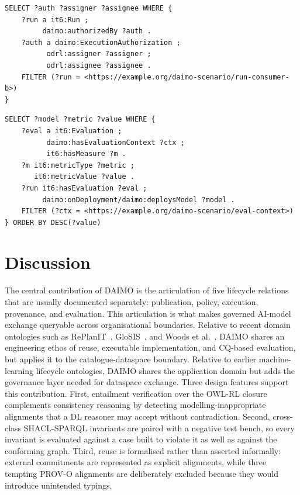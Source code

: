 \documentclass[Afour,sagev,times]{sagej}
\begin{document}
\begin{lstlisting}[label=lst:cq-g3,caption={CQ-G3: authorisation and agreement for a specific run.}]
SELECT ?auth ?assigner ?assignee WHERE {
    ?run a it6:Run ;
         daimo:authorizedBy ?auth .
    ?auth a daimo:ExecutionAuthorization ;
          odrl:assigner ?assigner ;
          odrl:assignee ?assignee .
    FILTER (?run = <https://example.org/daimo-scenario/run-consumer-b>)
}
\end{lstlisting}

\begin{lstlisting}[label=lst:cq-v3,caption={CQ-V3: ranking of models under a shared evaluation context.}]
SELECT ?model ?metric ?value WHERE {
    ?eval a it6:Evaluation ;
          daimo:hasEvaluationContext ?ctx ;
          it6:hasMeasure ?m .
    ?m it6:metricType ?metric ;
       it6:metricValue ?value .
    ?run it6:hasEvaluation ?eval ;
         daimo:onDeployment/daimo:deploysModel ?model .
    FILTER (?ctx = <https://example.org/daimo-scenario/eval-context>)
} ORDER BY DESC(?value)
\end{lstlisting}


\section{Discussion}\label{sec:discussion}

The central contribution of DAIMO is the articulation of five lifecycle relations that are usually documented separately: publication, policy, execution, provenance, and evaluation. This articulation is what makes governed AI-model exchange queryable across organisational boundaries. Relative to recent domain ontologies such as RePlanIT~\cite{kurteva}, GloSIS~\cite{palma}, and Woods et al.~\cite{woods}, DAIMO shares an engineering ethos of reuse, executable implementation, and CQ-based evaluation, but applies it to the catalogue-dataspace boundary. Relative to earlier machine-learning lifecycle ontologies, DAIMO shares the application domain but adds the governance layer needed for dataspace exchange. Three design features support this contribution. First, entailment verification over the OWL-RL closure complements consistency reasoning by detecting modelling-inappropriate alignments that a DL reasoner may accept without contradiction. Second, cross-class SHACL-SPARQL invariants are paired with a negative test bench, so every invariant is evaluated against a case built to violate it as well as against the conforming graph. Third, reuse is formalised rather than asserted informally: external commitments are represented as explicit alignments, while three tempting PROV-O alignments are deliberately excluded because they would introduce unintended typings.
\end{document}
